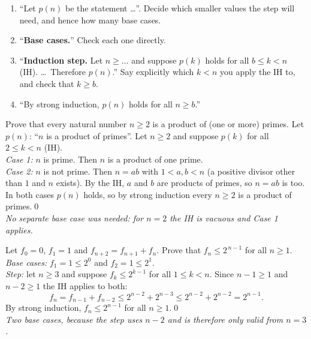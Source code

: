 \begin{strategy}
\begin{enumerate}
\item ``Let $p(n)$ be the statement \dots''. Decide which smaller values the step will need, and hence how many base cases.
\item ``\textbf{Base cases.}'' Check each one directly.
\item ``\textbf{Induction step.} Let $n\ge\dots$ and suppose $p(k)$ holds for all $b\le k<n$ (IH). \dots\ Therefore $p(n)$.'' Say explicitly which $k<n$ you apply the IH to, and check that $k\ge b$.
\item ``By strong induction, $p(n)$ holds for all $n\ge b$.''
\end{enumerate}
\end{strategy}

\begin{hexample}
Prove that every natural number $n\ge2$ is a product of (one or more) primes.
\solution
Let $p(n)$: ``$n$ is a product of primes''. Let $n\ge2$ and suppose $p(k)$ for all $2\le k<n$ (IH).\\
\emph{Case 1:} $n$ is prime. Then $n$ is a product of one prime.\\
\emph{Case 2:} $n$ is not prime. Then $n=ab$ with $1<a,b<n$ (a positive divisor other than $1$ and $n$ exists). By the IH, $a$ and $b$ are products of primes, so $n=ab$ is too.\\
In both cases $p(n)$ holds, so by strong induction every $n\ge2$ is a product of primes.\qed\\
\emph{No separate base case was needed: for $n=2$ the IH is vacuous and Case 1 applies.}
\end{hexample}

\begin{hexample}
Let $f_0=0$, $f_1=1$ and $f_{n+2}=f_{n+1}+f_n$. Prove that $f_n\le2^{\,n-1}$ for all $n\ge1$.
\solution
\emph{Base cases:} $f_1=1\le2^0$ and $f_2=1\le2^1$.\\
\emph{Step:} let $n\ge3$ and suppose $f_k\le2^{k-1}$ for all $1\le k<n$. Since $n-1\ge1$ and $n-2\ge1$ the IH applies to both:
\[
f_n=f_{n-1}+f_{n-2}\le2^{n-2}+2^{n-3}\le2^{n-2}+2^{n-2}=2^{n-1}.
\]
By strong induction, $f_n\le2^{n-1}$ for all $n\ge1$.\qed\\
\emph{Two base cases, because the step uses $n-2$ and is therefore only valid from $n=3$.}
\end{hexample}

